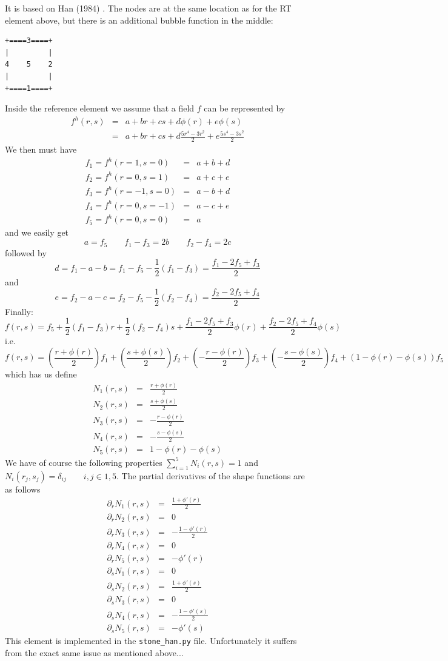 It is based on Han (1984) \cite{han84}.
The nodes are at the same location as for the RT element above, but 
there is an additional bubble function in the middle:
\begin{verbatim}
+====3====+
|         |
4    5    2
|         |
+====1====+
\end{verbatim}
Inside the reference element we assume that a field $f$
can be represented by 
\begin{eqnarray}
f^h(r,s) 
&=& a+ br +cs +d \phi(r) +e \phi(s) \\
&=& a+ br +cs +d \frac{5r^4-3r^2}{2}+e \frac{5s^4-3s^2}{2}
\end{eqnarray}
We then must have 
\begin{eqnarray}
f_1 = f^h(r=1,s=0) &=& a+ b +d \\
f_2 = f^h(r=0,s=1) &=& a+ c +e \\
f_3 = f^h(r=-1,s=0) &=& a- b +d \\
f_4 = f^h(r=0,s=-1) &=& a -c +e\\
f_5 = f^h(r=0,s=0) &=& a 
\end{eqnarray}
and we easily get 
\[
a = f_5 
\qquad
f_1-f_3 = 2b
\qquad 
f_2-f_4 = 2c
\]
followed by
\[
d=f_1-a-b = f_1 - f_5 - \frac{1}{2}(f_1-f_3) = \frac{f_1-2f_5+f_3}{2}
\]
and 
\[
e = f_2-a-c = f_2 - f_5 -  \frac{1}{2}(f_2-f_4) = \frac{f_2 -2f_5+f_4 }{2}
\]
Finally:
\[
f(r,s) = 
f_5 +
\frac{1}{2}(f_1-f_3) r+
\frac{1}{2}(f_2-f_4) s+
\frac{f_1-2f_5+f_3}{2} \phi(r)+
\frac{f_2 -2f_5+f_4 }{2} \phi(s)
\]
i.e.
\[
f(r,s) = 
\left(\frac{r + \phi(r)}{2} \right)f_1 +
\left(\frac{s+\phi(s)}{2} \right)f_2 +
\left(-\frac{r-\phi(r)}{2} \right)f_3 +
\left(-\frac{s - \phi(s)}{2} \right)f_4 +
\left(1-\phi(r)-\phi(s) \right)f_5 
\]
which has us define 
\begin{eqnarray}
N_1(r,s) &=& \frac{r + \phi(r)}{2} \\
N_2(r,s) &=& \frac{s+\phi(s)}{2}\\
N_3(r,s) &=& -\frac{r-\phi(r)}{2} \\
N_4(r,s) &=& -\frac{s - \phi(s)}{2}\\
N_5(r,s) &=& 1-\phi(r)-\phi(s)
\end{eqnarray}
We have of course the following properties $\sum_{i=1}^5 N_i(r,s) = 1$ and 
$N_i(r_j,s_j) = \delta_{ij}  \qquad i,j \in 1,5$. The partial derivatives of the shape functions are as follows
\begin{eqnarray}
\partial_r N_1(r,s) &=& \frac{1 + \phi'(r)}{2} \\
\partial_r N_2(r,s) &=& 0 \\
\partial_r N_3(r,s) &=& -\frac{1-\phi'(r)}{2} \\
\partial_r N_4(r,s) &=& 0 \\
\partial_r N_5(r,s) &=& -\phi'(r) \\
\partial_s N_1(r,s) &=& 0 \\
\partial_s N_2(r,s) &=& \frac{1 + \phi'(s)}{2} \\
\partial_s N_3(r,s) &=&  0 \\
\partial_s N_4(r,s) &=& -\frac{1-\phi'(s)}{2} \\
\partial_s N_5(r,s) &=& -\phi'(s)
\end{eqnarray}
This element is implemented in the {\tt stone\_han.py} file. 
Unfortunately it suffers from the exact same issue as mentioned above...






